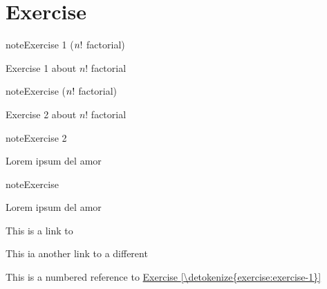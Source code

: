 

\pagestyle{empty}
\sphinxmaketitle
\pagestyle{plain}
\sphinxtableofcontents
\pagestyle{normal}
\label{\detokenize{index::doc}}



\chapter{Exercise}
\label{\detokenize{exercise:exercise}}\label{\detokenize{exercise::doc}} \label{exercise:exercise-1}
\begin{sphinxadmonition}{note}{Exercise 1 (\protect\(n!\protect\) factorial)}



\sphinxAtStartPar
Exercise 1 about \(n!\) factorial
\end{sphinxadmonition}
 \label{exercise:exercise-2}
\begin{sphinxadmonition}{note}{Exercise (\protect\(n!\protect\) factorial)}



\sphinxAtStartPar
Exercise 2 about \(n!\) factorial
\end{sphinxadmonition}
 \label{exercise:exercise-3}
\begin{sphinxadmonition}{note}{Exercise 2 }



\sphinxAtStartPar
Lorem ipsum del amor
\end{sphinxadmonition}
 \label{exercise:exercise-4}
\begin{sphinxadmonition}{note}{Exercise }



\sphinxAtStartPar
Lorem ipsum del amor
\end{sphinxadmonition}

\sphinxAtStartPar
This is a link to {\hyperref[\detokenize{exercise:exercise-1}]{}}

\sphinxAtStartPar
This ia another link to a different {\hyperref[\detokenize{exercise:exercise-3}]{}}

\sphinxAtStartPar
This is a numbered reference to \hyperref[\detokenize{exercise:exercise-1}]{Exercise \ref{\detokenize{exercise:exercise-1}}}


